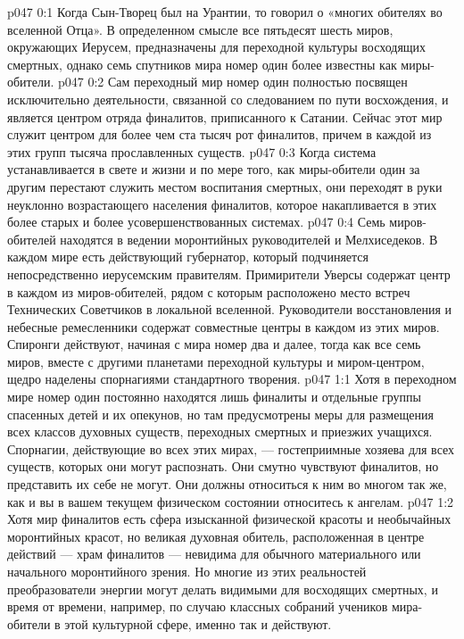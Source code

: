 \author{Блестящая Вечерняя Звезда}
\vs p047 0:1 Когда Сын\hyp{}Творец был на Урантии, то говорил о «многих обителях во вселенной Отца». В определенном смысле все пятьдесят шесть миров, окружающих Иерусем, предназначены для переходной культуры восходящих смертных, однако семь спутников мира номер один более известны как миры\hyp{}обители.
\vs p047 0:2 Сам переходный мир номер один полностью посвящен исключительно деятельности, связанной со следованием по пути восхождения, и является центром отряда финалитов, приписанного к Сатании. Сейчас этот мир служит центром для более чем ста тысяч рот финалитов, причем в каждой из этих групп тысяча прославленных существ.
\vs p047 0:3 Когда система устанавливается в свете и жизни и по мере того, как миры\hyp{}обители один за другим перестают служить местом воспитания смертных, они переходят в руки неуклонно возрастающего населения финалитов, которое накапливается в этих более старых и более усовершенствованных системах.
\vs p047 0:4 Семь миров\hyp{}обителей находятся в ведении моронтийных руководителей и Мелхиседеков. В каждом мире есть действующий губернатор, который подчиняется непосредственно иерусемским правителям. Примирители Уверсы содержат центр в каждом из миров\hyp{}обителей, рядом с которым расположено место встреч Технических Советчиков в локальной вселенной. Руководители восстановления и небесные ремесленники содержат совместные центры в каждом из этих миров. Спиронги действуют, начиная с мира номер два и далее, тогда как все семь миров, вместе с другими планетами переходной культуры и миром\hyp{}центром, щедро наделены спорнагиями стандартного творения.
\vs p047 1:1 Хотя в переходном мире номер один постоянно находятся лишь финалиты и отдельные группы спасенных детей и их опекунов, но там предусмотрены меры для размещения всех классов духовных существ, переходных смертных и приезжих учащихся. Спорнагии, действующие во всех этих мирах, --- гостеприимные хозяева для всех существ, которых они могут распознать. Они смутно чувствуют финалитов, но представить их себе не могут. Они должны относиться к ним во многом так же, как и вы в вашем текущем физическом состоянии относитесь к ангелам.
\vs p047 1:2 Хотя мир финалитов есть сфера изысканной физической красоты и необычайных моронтийных красот, но великая духовная обитель, расположенная в центре действий --- храм финалитов --- невидима для обычного материального или начального моронтийного зрения. Но многие из этих реальностей преобразователи энергии могут делать видимыми для восходящих смертных, и время от времени, например, по случаю классных собраний учеников мира\hyp{}обители в этой культурной сфере, именно так и действуют.
